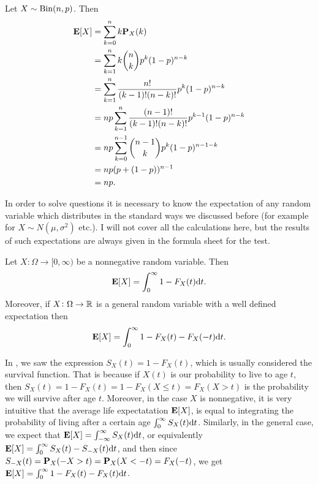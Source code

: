 \documentclass[11pt,a4paper]{article}
\begin{document}
\begin{example}
  Let $X \sim \operatorname{Bin}(n,p)$.
  Then
  \begin{align*}
    \mathbf{E}[X] &= \sum_{k=0}^{n} k \mathbf{P}_{X}(k) \\
    &= \sum_{k=1}^{n} k \binom{n}{k} p^k (1-p)^{n-k} \\
    &= \sum_{k=1}^{n} \frac{n!}{(k-1)!(n-k)!} p^{k} (1-p)^{n-k} \\
    &= n p \sum_{k=1}^{n} \frac{(n-1)!}{(k-1)!(n-k)!} p^{k-1} (1-p)^{n-k} \\
    &= n p\sum_{k=0}^{n-1}{\binom{n-1}{k}}p^{k}(1-p)^{n-1-k} \\
    &= n p(p+(1-p))^{n-1} \\
    &= n p.
  \end{align*}
\end{example}

\begin{remark}
  In order to solve questions it is necessary to know the expectation
  of any random variable which distributes in the standard ways we discussed
  before (for example for $X \sim N(\mu,\sigma^2)$ etc.).
  I will not cover all the calculations here,
  but the results of such expectations are always given in the
  formula sheet for the test.
\end{remark}

\begin{proposition}
  \label{prop:survival-and-expectation}
  Let $X \colon \Omega \to [0,\infty)$ be a nonnegative random variable.
  Then
  \[
    \mathbf{E}[X] = \int_{0}^{\infty} 1 - F_X(t) \mathrm{d} t.
  \]
  Moreover, if $X \colon \Omega \to \mathbb{R}$ is a general random variable with a
  well defined expectation then
  \[
    \mathbf{E}[X] = \int_{0}^{\infty} 1 - F_X(t) - F_X(-t) \mathrm{d} t.
  \]
\end{proposition}

\begin{remark}
  In , we saw the expression
  $S_X(t) = 1 - F_X(t)$, which is usually considered the survival function.
  That is because if $X(t)$ is our probability to live to age $t$,
  then $S_X(t) = 1 - F_X(t) = 1 - F_X(X \le t) = F_X(X > t)$
  is the probability we will survive after age $t$.
  Moreover, in the case $X$ is nonnegative,
  it is very intuitive that the average life expectatation $\mathbf{E}[X]$,
  is equal to integrating the probability of living after a certain
  age $\int_{0}^{\infty} S_X(t) \mathrm{d} t$.
  Similarly, in the general case,
  we expect that $\mathbf{E}[X] = \int_{-\infty}^{\infty} S_X(t) \mathrm{d} t$,
  or equivalently $\mathbf{E}[X] = \int_{0}^{\infty} S_X(t) - S_{-X}(t) \mathrm{d} t$,
  and then since $S_{-X}(t) = \mathbf{P}_X(-X > t) = \mathbf{P}_X(X < -t) = F_X(-t)$,
  we get $\mathbf{E}[X] = \int_{0}^{\infty} 1 - F_X(t) - F_X(t) \mathrm{d} t$.
\end{remark}
\end{document}
